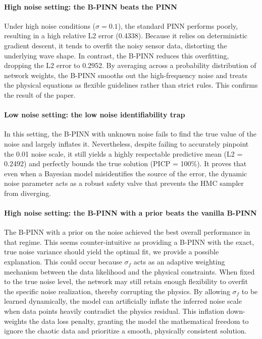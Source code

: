 \documentclass{article}
\begin{document}
\paragraph{High noise setting: the B-PINN beats the PINN}  Under high noise conditions ($\sigma=0.1$), the standard PINN performs poorly, resulting in a high relative L2 error (0.4338). Because it relies on deterministic gradient descent, it tends to overfit the noisy sensor data, distorting the underlying wave shape. In contrast, the B-PINN reduces this overfitting, dropping the L2 error to 0.2952. By averaging across a probability distribution of network weights, the B-PINN smooths out the high-frequency noise and treats the physical equations as flexible guidelines rather than strict rules. This confirms the result of the paper.


\paragraph{Low noise setting: the low noise identifiability trap} In this setting, the B-PINN with unknown noise fails to find the true value of the noise and largely inflates it. Nevertheless, despite failing to accurately pinpoint the 0.01 noise scale, it still yields a highly respectable predictive mean (L2 = 0.2492) and perfectly bounds the true solution (PICP = 100\%). It proves that even when a Bayesian model misidentifies the source of the error, the dynamic noise parameter acts as a robust safety valve that prevents the HMC sampler from diverging.

\paragraph{High noise setting: the B-PINN with a prior beats the vanilla B-PINN}
The B-PINN with a prior on the noise achieved the best overall performance in that regime. This seems counter-intuitive as providing a B-PINN with the exact, true noise variance should yield the optimal fit, we provide a possible explanation. This could occur  because $\sigma_f$ acts as an adaptive weighting mechanism between the data likelihood and the physical constraints.  When fixed to the true noise level, the network may still retain enough flexibility to overfit the specific noise realization, thereby corrupting the physics. By allowing $\sigma_f$ to be learned dynamically, the model can artificially inflate the inferred noise scale when data points heavily contradict the physics residual. This inflation down-weights the data loss penalty, granting the model the mathematical freedom to ignore the chaotic data and prioritize a smooth, physically consistent solution.
\end{document}
